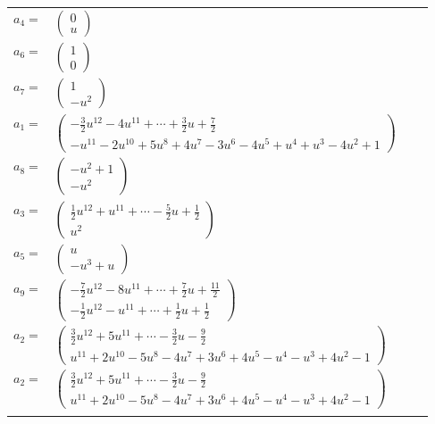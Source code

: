 \documentclass[1p]{elsarticle_modified}
\theoremstyle{definition}
\begin{document}
\begin{tabular}{m{7pt} m{180pt} m{7pt} m{180pt} }
\flushright $a_{4}=$&$\begin{pmatrix}0\\u\end{pmatrix}$ \\
\flushright $a_{6}=$&$\begin{pmatrix}1\\0\end{pmatrix}$ \\
\flushright $a_{7}=$&$\begin{pmatrix}1\\- u^2\end{pmatrix}$ \\
\flushright $a_{1}=$&$\begin{pmatrix}-\frac{3}{2} u^{12}-4 u^{11}+\cdots+\frac{3}{2} u+\frac{7}{2}\\- u^{11}-2 u^{10}+5 u^8+4 u^7-3 u^6-4 u^5+u^4+u^3-4 u^2+1\end{pmatrix}$ \\
\flushright $a_{8}=$&$\begin{pmatrix}- u^2+1\\- u^2\end{pmatrix}$ \\
\flushright $a_{3}=$&$\begin{pmatrix}\frac{1}{2} u^{12}+u^{11}+\cdots-\frac{5}{2} u+\frac{1}{2}\\u^2\end{pmatrix}$ \\
\flushright $a_{5}=$&$\begin{pmatrix}u\\- u^3+u\end{pmatrix}$ \\
\flushright $a_{9}=$&$\begin{pmatrix}-\frac{7}{2} u^{12}-8 u^{11}+\cdots+\frac{7}{2} u+\frac{11}{2}\\-\frac{1}{2} u^{12}- u^{11}+\cdots+\frac{1}{2} u+\frac{1}{2}\end{pmatrix}$ \\
\flushright $a_{2}=$&$\begin{pmatrix}\frac{3}{2} u^{12}+5 u^{11}+\cdots-\frac{3}{2} u-\frac{9}{2}\\u^{11}+2 u^{10}-5 u^8-4 u^7+3 u^6+4 u^5- u^4- u^3+4 u^2-1\end{pmatrix}$\\ \flushright $a_{2}=$&$\begin{pmatrix}\frac{3}{2} u^{12}+5 u^{11}+\cdots-\frac{3}{2} u-\frac{9}{2}\\u^{11}+2 u^{10}-5 u^8-4 u^7+3 u^6+4 u^5- u^4- u^3+4 u^2-1\end{pmatrix}$\\&\end{tabular}
\end{document}
